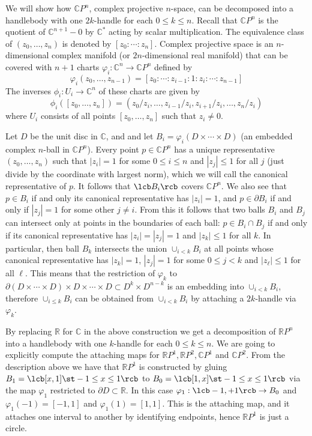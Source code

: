 \begin{example}
\label{handlebody decompositions of CP^n and RP^n}
We will show how $\mathbb CP^n$, complex projective $n$-space, can be decomposed into a handlebody with one $2k$-handle for each $0 \leq k \leq n$. Recall that $\mathbb CP^n$ is the quotient of $\mathbb C^{n+1}-0$ by $\mathbb C^*$ acting by scalar multiplication. The equivalence class of $(z_0,\ldots,z_n)$ is denoted by $[z_0:\cdots:z_n]$. Complex projective space is an $n$-dimensional complex manifold (or $2n$-dimensional real manifold) that can be covered with $n+1$ charts $\varphi_i : \mathbb C^n \rightarrow \mathbb CP^n$ defined by 
\[ \varphi_i(z_0,\ldots,z_{n-1}) = [z_0:\cdots:z_{i-1}:1:z_i:\cdots:z_{n-1}] \]
The inverses $\phi_i : U_i \rightarrow \mathbb C^n$ of these charts are given by
\[ \phi_i([z_0,\ldots,z_n]) = (z_0/z_i,\ldots,z_{i-1}/z_i,z_{i+1}/z_i,\ldots,z_n/z_i) \]
where $U_i$ consists of all points $[z_0,\ldots,z_n]$ such that $z_i \neq 0$. 

Let $D$ be the unit disc in $\mathbb C$, and and let $B_i = \varphi_i(D \times \cdots \times D)$ (an embedded complex $n$-ball in $\mathbb CP^n$). Every point $p \in \mathbb CP^n$ has a unique representative $(z_0,\ldots,z_n)$ such that $|z_i|=1$ for some $0 \leq i \leq n$ and $|z_j| \leq 1$ for all $j$ (just divide by the coordinate with largest norm), which we will call the canonical representative of $p$. It follows that $\lcb B_i \rcb$ covers $\mathbb CP^n$. We also see that $p \in B_i$ if and only its canonical representative has $|z_i|=1$, and $p \in \partial B_i$ if and only if $|z_j| = 1$ for some other $j \neq i$. From this it follows that two balls $B_i$ and $B_j$ can intersect only at points in the boundaries of each ball: $p \in B_i \cap B_j$ if and only if its canonical representative has $|z_i|=|z_j|=1$ and $|z_k| \leq 1$ for all $k$. In particular, then ball $B_k$ intersects the union $\cup_{i < k} B_i$ at all points whose canonical representative has $|z_k|=1$, $|z_j|=1$ for some $0 \leq j < k$ and $|z_\ell| \leq 1$ for all $\ell$. This means that the restriction of $\varphi_k$ to $\partial(D \times \cdots \times D) \times D \times \cdots \times D \subset D^k \times D^{n-k}$ is an embedding into $\cup_{i<k} B_i$, therefore $\cup_{i \leq k} B_i$ can be obtained from $\cup_{i<k} B_i$ by attaching a $2k$-handle via $\varphi_k$. 

By replacing $\mathbb R$ for $\mathbb C$ in the above construction we get a decomposition of $\mathbb RP^n$ into a handlebody with one $k$-handle for each $0 \leq k \leq n$. We are going to explicitly compute the attaching maps for $\mathbb RP^1,\mathbb RP^2,\mathbb CP^1$ and $\mathbb CP^2$. From the description above we have that $\mathbb RP^1$ is constructed by gluing $B_1 = \lcb [x,1] \st -1 \leq x \leq 1 \rcb$ to $B_0 = \lcb [1,x] \st -1 \leq x \leq 1 \rcb$ via the map $\varphi_1$ restricted to $\partial D \subset \mathbb R$. In this case $\varphi_1 : \lcb -1,+1 \rcb \rightarrow B_0$ and $\varphi_1(-1)=[-1,1]$ and $\varphi_1(1)=[1,1]$. This is the attaching map, and it attaches one interval to another by identifying endpoints, hence $\mathbb RP^1$ is just a circle.


\end{example}
